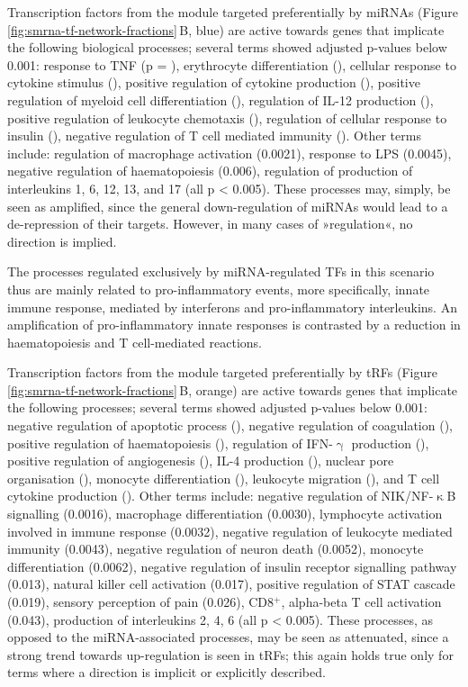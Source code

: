Transcription factors from the module targeted preferentially by miRNAs (Figure \ref{fig:smrna-tf-network-fractions}\,B, blue) are active towards genes that implicate the following biological processes; several terms showed adjusted p-values below 0.001: response to TNF (p = ), erythrocyte differentiation (), cellular response to cytokine stimulus (), positive regulation of cytokine production (), positive regulation of myeloid cell differentiation (), regulation of IL-12 production (), positive regulation of leukocyte chemotaxis (), regulation of cellular response to insulin (), negative regulation of T cell mediated immunity (). Other terms include: regulation of macrophage activation (0.0021), response to LPS (0.0045), negative regulation of haematopoiesis (0.006), regulation of production of interleukins 1, 6, 12, 13, and 17 (all p < 0.005). These processes may, simply, be seen as amplified, since the general down-regulation of miRNAs would lead to a de-repression of their targets. However, in many cases of »regulation«, no direction is implied.

The processes regulated exclusively by miRNA-regulated TFs in this scenario thus are mainly related to pro-inflammatory events, more specifically, innate immune response, mediated by interferons and pro-inflammatory interleukins. An amplification of pro-inflammatory innate responses is contrasted by a reduction in haematopoiesis and T cell-mediated reactions.

Transcription factors from the module targeted preferentially by tRFs (Figure \ref{fig:smrna-tf-network-fractions}\,B, orange) are active towards genes that implicate the following processes; several terms showed adjusted p-values below 0.001: negative regulation of apoptotic process (), negative regulation of coagulation (), positive regulation of haematopoiesis (), regulation of IFN-$\upgamma$ production (), positive regulation of angiogenesis (), IL-4 production (), nuclear pore organisation (), monocyte differentiation (), leukocyte migration (), and T cell cytokine production (). Other terms include: negative regulation of NIK/NF-$\upkappa$B signalling (0.0016), macrophage differentiation (0.0030), lymphocyte activation involved in immune response (0.0032), negative regulation of leukocyte mediated immunity (0.0043), negative regulation of neuron death (0.0052), monocyte differentiation (0.0062), negative regulation of insulin receptor signalling pathway (0.013), natural killer cell activation (0.017), positive regulation of STAT cascade (0.019), sensory perception of pain (0.026), CD8$^+$, alpha-beta T cell activation (0.043), production of interleukins 2, 4, 6 (all p < 0.005). These processes, as opposed to the miRNA-associated processes, may be seen as attenuated, since a strong trend towards up-regulation is seen in tRFs; this again holds true only for terms where a direction is implicit or explicitly described.

